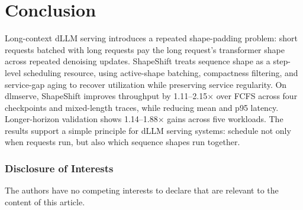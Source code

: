 \documentclass[a4paper]{llncs}
\begin{document}
\section{Conclusion}

Long-context dLLM serving introduces a repeated shape-padding problem: short requests batched with long requests pay the long request's transformer shape across repeated denoising updates. ShapeShift treats sequence shape as a step-level scheduling resource, using active-shape batching, compactness filtering, and service-gap aging to recover utilization while preserving service regularity. On dlmserve, ShapeShift improves throughput by 1.11--2.15$\times$ over FCFS across four checkpoints and mixed-length traces, while reducing mean and p95 latency. Longer-horizon validation shows 1.14--1.88$\times$ gains across five workloads. The results support a simple principle for dLLM serving systems: schedule not only when requests run, but also which sequence shapes run together.

\begin{credits}
\subsubsection*{Disclosure of Interests}
The authors have no competing interests to declare that are relevant to the content of this article.
\end{credits}



\end{document}
